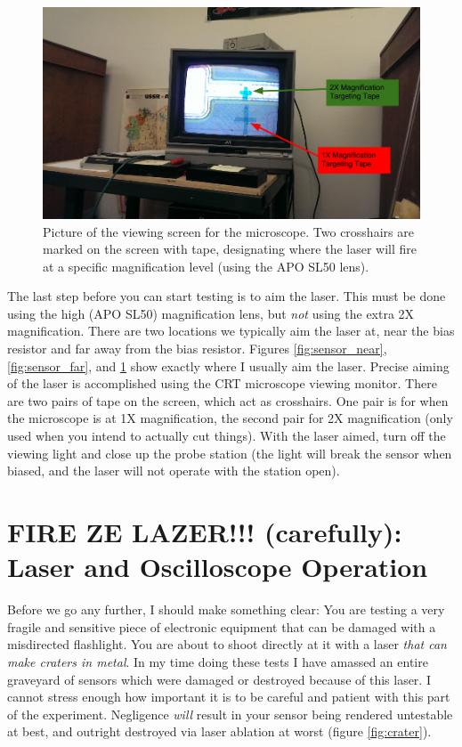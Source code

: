 \documentclass{report}
\begin{document}
            \begin{figure}[h] 
                \includegraphics[height=.4\textheight]{monitor}
                \centering
                \caption{ Picture of the viewing screen for the microscope. Two crosshairs are marked on the screen with tape, designating where the laser will fire at a specific magnification level (using the APO SL50 lens). }
                \label{fig:monitor}
            \end{figure}

            The last step before you can start testing is to aim the laser. This must be done using the high (APO SL50) magnification lens, but \textit{not} using the extra 2X magnification. There are two locations we typically aim the laser at, near the bias resistor and far away from the bias resistor. Figures \ref{fig:sensor_near}, \ref{fig:sensor_far}, and \ref{fig:monitor} show exactly where I usually aim the laser. Precise aiming of the laser is accomplished using the CRT microscope viewing monitor. There are two pairs of tape on the screen, which act as crosshairs. One pair is for when the microscope is at 1X magnification, the second pair for 2X magnification (only used when you intend to actually cut things). With the laser aimed, turn off the viewing light and close up the probe station (the light will break the sensor when biased, and the laser will not operate with the station open).

        \section{ FIRE ZE LAZER!!! (carefully): \\ Laser and Oscilloscope Operation }
            Before we go any further, I should make something clear: You are testing a very fragile and sensitive piece of electronic equipment that can be damaged with a misdirected flashlight. You are about to shoot directly at it with a laser \textit{that can make craters in metal}. In my time doing these tests I have amassed an entire graveyard of sensors which were damaged or destroyed because of this laser. I cannot stress enough how important it is to be careful and patient with this part of the experiment. Negligence \textit{will} result in your sensor being rendered untestable at best, and outright destroyed via laser ablation at worst (figure \ref{fig:crater}).
\end{document}
